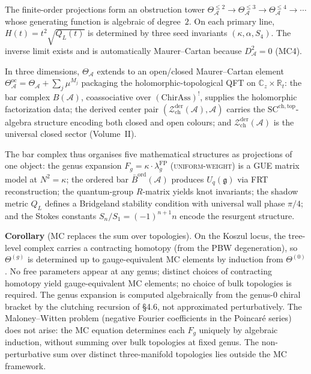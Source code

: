 \documentclass[11pt,reqno]{amsart}
\theoremstyle{definition}
\theoremstyle{remark}
\providecommand{\cA}{\mathcal{A}}
\providecommand{\cZ}{\mathcal{Z}}
\providecommand{\barB}{\bar{B}}
\providecommand{\SCchtop}{\mathrm{SC}^{\mathrm{ch,top}}}
\numberwithin{equation}{section}
\begin{document}
The finite-order projections form an obstruction tower
$\Theta_\cA^{\le 2}\to\Theta_\cA^{\le 3}\to\Theta_\cA^{\le 4}\to\cdots$
whose generating function is algebraic of degree~$2$. On each
primary line,
$H(t)=t^2\sqrt{Q_L(t)}$ is determined by three seed invariants
$(\kappa,\alpha,S_4)$. The inverse limit exists and is automatically
Maurer--Cartan because $D_\cA^2=0$ (MC4).

In three dimensions, $\Theta_\cA$ extends to an open/closed
Maurer--Cartan element
$\Theta^{\mathrm{oc}}_\cA=\Theta_\cA+\sum_j\mu^{M_j}$
packaging the holomorphic-topological QFT on
$\mathbb C_z\times\mathbb R_t$: the bar complex $B(\cA)$, coassociative over $(\mathrm{ChirAss})^!$,
supplies the holomorphic factorization data; the derived center pair
$(\cZ^{\mathrm{der}}_{\mathrm{ch}}(\cA), \cA)$ carries the
$\SCchtop$-algebra structure encoding both closed and open colours;
and $\cZ^{\mathrm{der}}_{\mathrm{ch}}(\cA)$ is the universal closed sector
(Volume~II).

The bar complex thus organises five mathematical structures as
projections of one object: the genus expansion
$F_g=\kappa\cdot\lambda_g^{\mathrm{FP}}$ \textsc{(uniform-weight)} is
a GUE matrix model at $N^2=\kappa$; the ordered bar
$\barB^{\mathrm{ord}}(\cA)$ produces $U_q(\mathfrak g)$ via FRT
reconstruction; the quantum-group $R$-matrix yields knot invariants;
the shadow metric $Q_L$ defines a Bridgeland stability condition with
universal wall phase $\pi/4$; and the Stokes constants
$S_n/S_1=(-1)^{n+1}n$ encode the resurgent structure.

\medskip
\noindent\textbf{Corollary} (MC replaces the sum over topologies).
On the Koszul locus, the tree-level complex carries a contracting
homotopy (from the PBW degeneration), so $\Theta^{(g)}$ is determined
up to gauge-equivalent MC elements by induction from $\Theta^{(0)}$.
No free parameters appear at any genus; distinct choices of
contracting homotopy yield gauge-equivalent MC elements; no choice of
bulk topologies is required. The genus expansion is computed
algebraically from the genus-$0$ chiral bracket by the clutching
recursion of \S4.6, not approximated perturbatively. The
Maloney--Witten problem (negative Fourier coefficients in the
Poincar\'e series) does not arise: the MC equation determines each
$F_g$ uniquely by algebraic induction, without summing over bulk
topologies at fixed genus. The non-perturbative sum over distinct
three-manifold topologies lies outside the MC framework.


\end{document}
